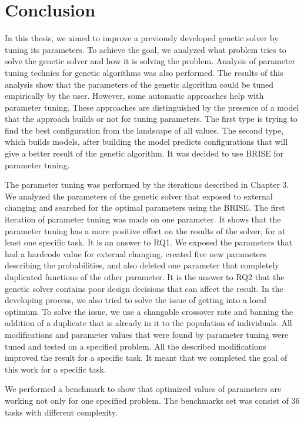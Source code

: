 \chapter{Conclusion}
In this thesis, we aimed to improve a previously developed genetic solver by tuning its parameters. To achieve the goal, we analyzed what problem tries to solve the genetic solver and how it is solving the problem. Analysis of parameter tuning technics for genetic algorithms was also performed. The results of this analysis show that the parameters of the genetic algorithm could be tuned empirically by the user. However, some automatic approaches help with parameter tuning. These approaches are distinguished by the presence of a model that the approach builds or not for tuning parameters. The first type is trying to find the best configuration from the landscape of all values. The second type, which builds models, after building the model predicts configurations that will give a better result of the genetic algorithm. It was decided to use BRISE for parameter tuning.

The parameter tuning was performed by the iterations described in Chapter 3. We analyzed the parameters of the genetic solver that exposed to external changing and searched for the optimal parameters using the BRISE.
The first iteration of parameter tuning was made on one parameter. It shows that the parameter tuning has a more positive effect on the results of the solver, for at least one specific task. It is an answer to RQ1.
We exposed the parameters that had a hardcode value for external changing, created five new parameters describing the probabilities, and also deleted one parameter that completely duplicated functions of the other parameter. It is the answer to RQ2 that the genetic solver contains poor design decisions that can affect the result.
In the developing process, we also tried to solve the issue of getting into a local optimum.  To solve the issue, we use a changable crossover rate and banning the addition of a duplicate that is already in it to the population of individuals.
All modifications and parameter values that were found by parameter tuning were tuned and tested on a specified problem.
All the described modifications improved the result for a specific task. It meant that we completed the goal of this work for a specific task.

We performed a benchmark to show that optimized values of parameters are working not only for one specified problem. The benchmarks set was consist of 36 tasks with different complexity. 

